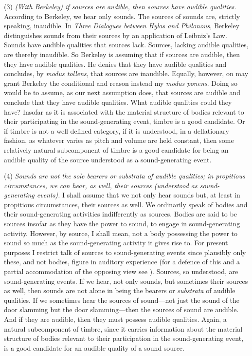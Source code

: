 \documentclass[12pt]{article}
\begin{document}
(3) \emph{(With Berkeley) if sources are audible, then sources have audible qualities.} According to Berkeley, we hear only sounds. The sources of sounds are, strictly speaking, inaudible. In \emph{Three Dialogues between Hylas and Philonous}, Berkeley distinguishes sounds from their sources by an application of Leibniz's Law. Sounds have audible qualities that sources lack. Sources, lacking audible qualities, are thereby inaudible. So Berkeley is assuming that if sources are audible, then they have audible qualities. He denies that they have audible qualities and concludes, by \emph{modus tollens}, that sources are inaudible. Equally, however, on may grant Berkeley the conditional and reason instead my \emph{modus ponens}. Doing so would be to assume, as our next assumption does, that sources are audible and conclude that they have audible qualities. What audible qualities could they have? Insofar as it is associated with the material structure of bodies  relevant to their participating in the sound-generating event, timbre is a good candidate. Or if timbre is not a well defined category, if it is understood, in a deflationary fashion, as whatever varies as pitch and volume are held constant, then some relatively natural subcomponent of timbre is a good candidate for being an audible quality of the source understood as a sound-generating event.

(4) \emph{Sounds are not the sole bearers or \emph{substrata} of audible qualities; in propitious circumstances, we can hear, as well, their sources (understood as sound-generating events).} I shall assume that we not only hear sounds but, at least in propitious circumstances, their sources as well. We ordinarily speak of bodies and their sound-generating activities indifferently as sources. Bodies are said to be sources insofar as they have the power to sound, to engage in sound-generating activity. However, by source, I shall mean, not a body possessing the power to sound so much as the sound-generating activity it gives rise to. For present purposes I restrict talk of sources to sound-generating events since plausibly only these, and not bodies, figure in auditory experience (for a defence of this and a partial accommodation of the opposing view see \citealt[chapter 3.4]{Kalderon:2018oe}). Sources, so understood, are sound-generating events. If we hear, not only sounds, but sometimes their sources as well, then sounds are not alone in being the bearers or \emph{substrata} of audible qualities. If we sometimes hear the sources of sound---not just the sound of the door slamming but the door slamming---then the sources of sound are audible. And if they are audible, then they must possess audible qualities. Again, a natural subcomponent of timbre, since it carries information about the material structure of bodies relevant to their participation in the sound-generating event, is a good candidate for an audible quality of a sound source.
\end{document}
